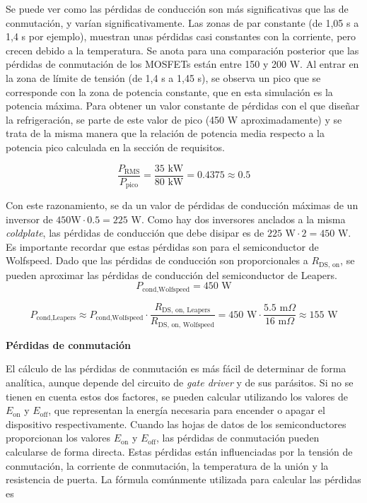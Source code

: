 Se puede ver como las pérdidas de conducción son más significativas que las de conmutación, y varían significativamente. Las zonas de par constante (de 1,05 s a 1,4 s por ejemplo), muestran unas pérdidas casi constantes con la corriente, pero crecen debido a la temperatura. Se anota para una comparación posterior que las pérdidas de conmutación de los MOSFETs están entre 150 y 200 W. Al entrar en la zona de límite de tensión (de 1,4 s a 1,45 s), se observa un pico que se corresponde con la zona de potencia constante, que en esta simulación es la potencia máxima. Para obtener un valor constante de pérdidas con el que diseñar la refrigeración, se parte de este valor de pico (450 W aproximadamente) y se trata de la misma manera que la relación de potencia media respecto a la potencia pico calculada en la sección de requisitos.

\[
\frac{P_{\text{RMS}}}{P_{\text{pico}}} = \frac{35\text{ kW}}{80\text{ kW}} = 0.4375 \approx 0.5
\]

Con este razonamiento, se da un valor de pérdidas de conducción máximas de un inversor de $450 \text{W} \cdot 0.5 = 225 \text{ W}$. Como hay dos inversores anclados a la misma \textit{coldplate}, las pérdidas de conducción que debe disipar es de $225 \text{ W} \cdot 2 = 450 \text{ W}$. Es importante recordar que estas pérdidas son para el semiconductor de Wolfspeed. Dado que las pérdidas de conducción son proporcionales a $R_{\text{DS, on}}$, se pueden aproximar las pérdidas de conducción del semiconductor de Leapers.
\[
P_{\text{cond,Wolfspeed}} = 450 \text{ W}
\]

\[
P_{\text{cond,Leapers}} \approx P_{\text{cond,Wolfspeed}} \cdot \frac{R_{\text{DS, on, Leapers}}}{R_{\text{DS, on, Wolfspeed}}} = 450 \text{ W} \cdot \frac{5.5 \text{ m}\Omega}{16 \text{ m}\Omega} \approx 155 \text{ W}
\]


\textbf{Pérdidas de conmutación}

El cálculo de las pérdidas de conmutación es más fácil de determinar de forma analítica, aunque depende del circuito de \textit{gate driver} y de sus parásitos. Si no se tienen en cuenta estos dos factores, se pueden calcular utilizando los valores de \(E_{\text{on}}\) y \(E_{\text{off}}\), que representan la energía necesaria para encender o apagar el dispositivo respectivamente. Cuando las hojas de datos de los semiconductores proporcionan los valores \(E_{\text{on}}\) y \(E_{\text{off}}\), las pérdidas de conmutación pueden calcularse de forma directa. Estas pérdidas están influenciadas por la tensión de conmutación, la corriente de conmutación, la temperatura de la unión y la resistencia de puerta. La fórmula comúnmente utilizada para calcular las pérdidas es


